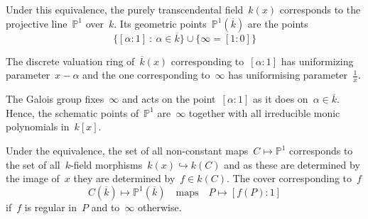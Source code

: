 \begin{example}
  Under this equivalence, the purely transcendental field~$k(x)$ corresponds to the projective line~$\mathbb{P}^1$ over~$k$. Its geometric points~$\mathbb{P}^1(\overline{k})$ are the points
  \begin{equation}
  	\{ [\alpha : 1]~:~\alpha \in \overline{k} \} \cup \{ \infty = [1 : 0] \}
  \end{equation}
  
  The discrete valuation ring of~$\overline{k}(x)$ corresponding to~$[\alpha : 1]$ has uniformizing parameter~$x-\alpha$ and the one corresponding to~$\infty$ has uniformising parameter~$\tfrac{1}{x}$.
  
  The Galois group fixes~$\infty$ and acts on the point~$[\alpha : 1]$ as it does on~$\alpha \in \overline{k}$. Hence, the schematic points of~$\mathbb{P}^1$ are~$\infty$ together with all irreducible monic polynomials in~$k[x]$.
  
  Under the equivalence, the set of all non-constant maps~$C \mapsto \mathbb{P}^1$ corresponds to the set of all~$k$-field morphisms~$k(x) \hookrightarrow k(C)$ and as these are determined by the image of~$x$ they are determined by~$f \in k(C)$. The cover corresponding to~$f$
  \begin{equation}
    C(\overline{k}) \mapsto \mathbb{P}^1(\overline{k}) \quad \text{maps} \quad P \mapsto [f(P) : 1]
  \end{equation}
  if~$f$ is regular in~$P$ and to~$\infty$ otherwise.
\end{example}
